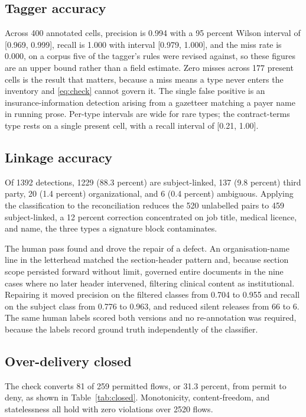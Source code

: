 \documentclass[conference]{IEEEtran}
\begin{document}
\subsection{Tagger accuracy}
Across 400 annotated cells, precision is 0.994 with a 95 percent Wilson interval
of [0.969, 0.999], recall is 1.000 with interval [0.979, 1.000], and the miss
rate is 0.000, on a corpus five of the tagger's rules were revised against, so
these figures are an upper bound rather than a field estimate. Zero misses
across 177 present cells is the result that matters, because a miss means a type
never enters the inventory and \eqref{eq:check} cannot govern it. The single
false positive is an insurance-information detection arising from a gazetteer
matching a payer name in running prose. Per-type intervals are wide for rare
types; the contract-terms type rests on a single present cell, with a recall
interval of [0.21, 1.00].

\subsection{Linkage accuracy}
Of 1392 detections, 1229 (88.3 percent) are subject-linked, 137 (9.8 percent)
third party, 20 (1.4 percent) organizational, and 6 (0.4 percent) ambiguous.
Applying the classification to the reconciliation reduces the 520 unlabelled
pairs to 459 subject-linked, a 12 percent correction concentrated on job title,
medical licence, and name, the three types a signature block contaminates.

The human pass found and drove the repair of a defect. An organisation-name line
in the letterhead matched the section-header pattern and, because section scope
persisted forward without limit, governed entire documents in the nine cases
where no later header intervened, filtering clinical content as institutional.
Repairing it moved precision on the filtered classes from 0.704 to 0.955 and
recall on the subject class from 0.776 to 0.963, and reduced silent releases
from 66 to 6. The same human labels scored both versions and no re-annotation
was required, because the labels record ground truth independently of the
classifier.

\subsection{Over-delivery closed}
The check converts 81 of 259 permitted flows, or 31.3 percent, from permit to
deny, as shown in Table~\ref{tab:closed}. Monotonicity, content-freedom, and
statelessness all hold with zero violations over 2520 flows.
\end{document}
